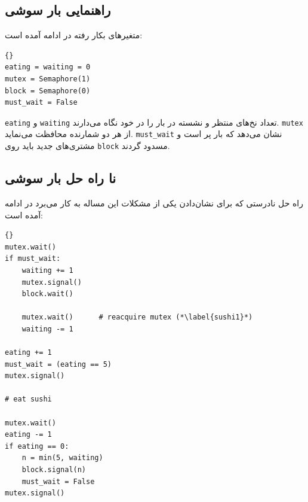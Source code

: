 \documentclass{book}
\newcommand{\clearemptydoublepage}{\newpage\cleardoublepage}
\begin{document}
\subsection{راهنمایی بار سوشی}

    متغیرهای بکار رفته در ادامه آمده است:

\begin{latin}
\begin{lstlisting}[title=\rl{راهنمایی بار سوشی}]{}
eating = waiting = 0
mutex = Semaphore(1)
block = Semaphore(0)
must_wait = False
\end{lstlisting}
\end{latin}



    {\tt eating} و {\tt waiting}
    تعداد نخ‌های منتظر و نشسته در بار را در خود نگاه می‌دارند. {\tt mutex}  از هر دو شمارنده محافظت می‌نماید.  {\tt must\_wait}
    نشان می‌دهد که بار پر است و مشتری‌های جدید باید روی  {\tt block} مسدود گردند. 
    

\clearemptydoublepage
\subsection{نا راه حل بار سوشی}

    راه حل نادرستی که  برای نشان‌دادن یکی از مشکلات این مساله به کار می‌برد در ادامه آمده است: 

\begin{latin}
\begin{lstlisting}[title=\rl{نا راه حل بار سوشی}]{}
mutex.wait()
if must_wait:
    waiting += 1
    mutex.signal()
    block.wait()

    mutex.wait()      # reacquire mutex (*\label{sushi1}*)
    waiting -= 1

eating += 1
must_wait = (eating == 5)
mutex.signal()

# eat sushi

mutex.wait()
eating -= 1
if eating == 0:
    n = min(5, waiting)
    block.signal(n)
    must_wait = False
mutex.signal()
\end{lstlisting}
\end{latin}
\end{document}
